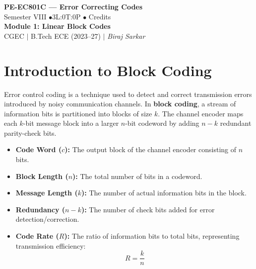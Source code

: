 \documentclass[12pt,a4paper]{article}
\begin{document}

\begin{center}
  {\LARGE\bfseries\color{myred} PE-EC801C --- Error Correcting Codes}\\[5pt]
  {\normalsize\color{mydark} Semester VIII \quad$\bullet$\quad 3L:0T:0P \quad$\bullet$ Credits}\\[3pt]
  {\normalsize\color{myteal}\textbf{Module 1: Linear Block Codes}}\\[3pt]
  {\small\color{mydark} CGEC \;$|$\; B.Tech ECE (2023--27) \;$|$\; \textit{Biraj Sarkar}}
\end{center}
\vspace{2pt}
\noindent{\color{myred}\rule{\linewidth}{1.5pt}}
\vspace{2pt}

\hypersetup{linkcolor=mydark}
\tableofcontents
\hypersetup{linkcolor=myteal}
\newpage

\section{Introduction to Block Coding}

Error control coding is a technique used to detect and correct transmission errors introduced by noisy communication channels. In \textbf{block coding}, a stream of information bits is partitioned into blocks of size $k$. The channel encoder maps each $k$-bit message block into a larger $n$-bit codeword by adding $n-k$ redundant parity-check bits.

\begin{tcolorbox}[defbox, title={\textbf{Key Coding Definitions}}]
\begin{itemize}[leftmargin=*, itemsep=3pt, topsep=0pt]
  \item \textbf{Code Word ($c$):} The output block of the channel encoder consisting of $n$ bits.
  \item \textbf{Block Length ($n$):} The total number of bits in a codeword.
  \item \textbf{Message Length ($k$):} The number of actual information bits in the block.
  \item \textbf{Redundancy ($n-k$):} The number of check bits added for error detection/correction.
  \item \textbf{Code Rate ($R$):} The ratio of information bits to total bits, representing transmission efficiency:
    \[ R = \frac{k}{n} \]
\end{itemize}
\end{tcolorbox}
\end{document}
